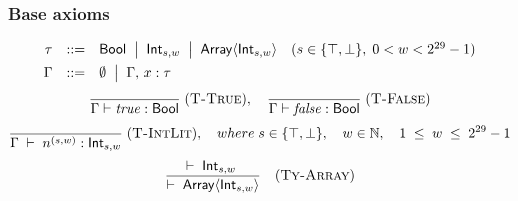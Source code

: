 \subsubsection*{Base axioms}
\[
  \begin{array}{rcll}
    \tau   & ::=                                & \mathsf{Bool}
    \;\bigm|\; \mathsf{Int}_{s,w}
    \;\bigm|\; \mathsf{Array}\langle\mathsf{Int}_{s,w}\rangle
           & (s\in\{\top,\bot\},\;0<w<2^{29}-1)                 \\[1ex]
    \Gamma & ::=                                & \emptyset
    \;\bigm|\; \Gamma,\,x:\tau
  \end{array}
\]
\[
  \frac{}{\Gamma \vdash \mathit{true} : \mathsf{Bool}}
  \; (\textsc{T-True}), \quad
  \frac{}{\Gamma \vdash \mathit{false} : \mathsf{Bool}}
  \; (\textsc{T-False})
\]
\[
  \frac{}
  {\Gamma \;\vdash\; n^{(s,w)} : \mathsf{Int}_{s,w}}
  \; (\textsc{T-IntLit}), \quad
  where\;
  s \in \{\top, \bot\},
  \quad
  w \in \mathbb{N},
  \quad
  1 \;\le\; w \;\le\; 2^{29}-1
\]
\[
  \frac{\vdash\;\mathsf{Int}_{s,w}\;}
  {\vdash\;\mathsf{Array}\langle\mathsf{Int}_{s,w}\rangle}
  \quad(\textsc{Ty-Array})
\]


